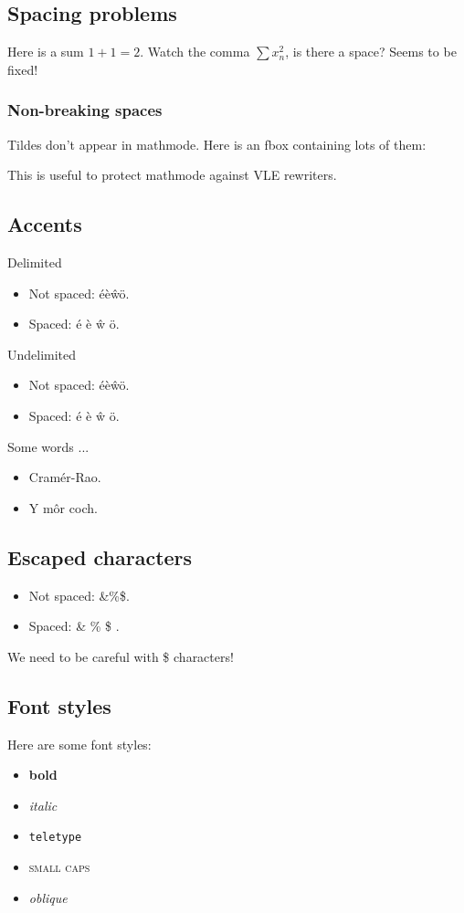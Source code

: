\documentclass[12pt]{article}
\theoremstyle{plain}
\theoremstyle{definition}
\theoremstyle{remark}
\theoremstyle{mystyle}
\begin{document}
\subsection{Spacing problems}
Here is a sum $1+1=2$. Watch the comma $\sum x_n^2$, is there a space? Seems to be fixed!

\subsubsection*{Non-breaking spaces}
Tildes don't appear in mathmode. Here is an fbox containing lots of them:
\par
{}
\par
This is useful to protect mathmode against VLE rewriters.


\subsection{Accents}
Delimited
\begin{itemize}
\item Not spaced: \'{e}\`{e}\^{w}\"{o}.
\item Spaced: \'{e} \`{e} \^{w} \"{o}.
\end{itemize}

Undelimited
\begin{itemize}
\item Not spaced: \'e\`e\^w\"o.
\item Spaced: \'e \`e \^w \"o.
\end{itemize}

Some words ...
\begin{itemize}
\item Cram\'{e}r-Rao.
\item Y m\^{o}r coch.
\end{itemize}

\subsection{Escaped characters}
\begin{itemize}
\item Not spaced: \&\%\$.
\item Spaced: \& \% \$ .
\end{itemize}	

We need to be careful with \$ characters!

\subsection{Font styles}
Here are some font styles: 
\begin{itemize}
\item \textbf{bold}
\item \textit{italic}
\item \texttt{teletype}
\item \textsc{small caps} 
\item \textsl{oblique}
\end{itemize}
\end{document}
